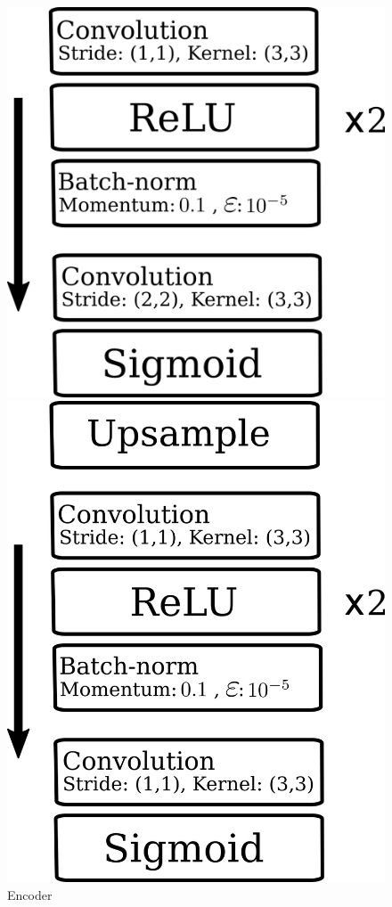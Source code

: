 \begin{figure}[!tbp]
  \centering
  \begin{minipage}[b]{0.4\textwidth}
    \includegraphics[width=\textwidth]{figures/encoder.png}
    \caption{Encoder}
    \label{fig:encoder}
  \end{minipage}
  \hfill
  \begin{minipage}[b]{0.4\textwidth}
    \includegraphics[width=\textwidth]{figures/decoder.png}

\end{minipage}
\end{figure}

